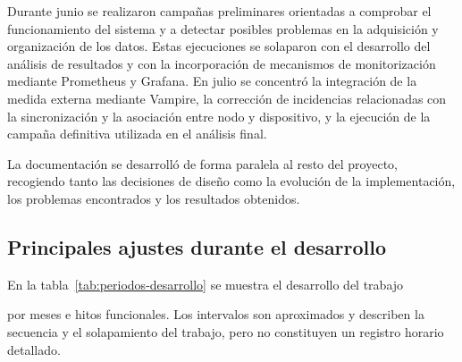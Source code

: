 Durante junio se realizaron campañas preliminares orientadas a comprobar el funcionamiento del sistema y a detectar posibles problemas en la adquisición y organización de los datos. Estas ejecuciones se solaparon con el desarrollo del análisis de resultados y con la incorporación de mecanismos de monitorización mediante Prometheus y Grafana. En julio se concentró la integración de la medida externa mediante Vampire, la corrección de incidencias relacionadas con la sincronización y la asociación entre nodo y dispositivo, y la ejecución de la campaña definitiva utilizada en el análisis final.

La documentación se desarrolló de forma paralela al resto del proyecto, recogiendo tanto las decisiones de diseño como la evolución de la implementación, los problemas encontrados y los resultados obtenidos.

\subsection{Principales ajustes durante el desarrollo}
\label{subsec:planificacion-real}

En la tabla~\ref{tab:periodos-desarrollo} se muestra el desarrollo del trabajo 

por meses e hitos funcionales. Los intervalos son aproximados y describen la secuencia y el solapamiento del trabajo, pero no constituyen un registro horario detallado.

